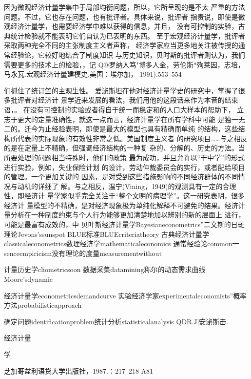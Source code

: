 因为微观经济计量学集中于局部均衡问题，所以，它所呈现的是不太
严重的方法问题。不过，它也存在问题，也有批评者。具体来说，批评者
指责说，即使是微观经济计量学，也需要经济学中难以获得的信息，并且，
没有可控制的实验，古典统计检验就不能表明它们自认为已表明的东西。
至于宏观经济计量学，批评者采取两种完全不同的主张制度主义者声称，
经济学家应当更多地关注被传授的通常经验论，它较好地结合了制度知识
与历史知识，贝时斯的批评者则认为，我们需要更多的技术上的检验，，记
Q@罗纳人笃"博多人金，劳伦斯*殉莱因，志培，马永瓦.宏观经济计量建模史.美国：埃尔加，
1991).553~554


们抓住了统订竺的主观生性。
爱泌斯坦在他对经济计量学史的研究中，掌握了很多批评者对经济计
景学近来发展的看法，我们用他的这段话来作为本音的结束语，。
在没有可控制的实验或者得自于统一而稳定和的人口大样本的帮助下，
立志于更大的定量准确性，就这一点而言，经济计量学在所有学科中可能
是独一无二的。迁今为止经验表明，即使是最大的模型也具有精确而单纯
的结构，这些结构所代表的实际现象的有效性非常之低。美国制度主义者
的研究项目……与之相反的是在定量上不精确，但强调经济结构的一种复
杂的、分解的、历史的方法。当所要处理的问题相当特殊时，他们的政策
最为成功，并且允许以“干中学”的形式进行实验，例如，失业保险计划
的设计，劳动仲裁委员会的实行，或者配给项目的管理。一个更加关键的
因素，是对受到这些措施影响的不同经济群体的不同情况与动机的详细了
解。与之相反，温宁(Vining，1949)的观测具有一定的合理性，即经济计
量学家似乎完全关注于“整个文明的病理学”。这一研究表明，很多经济计
量模型的不精确，是对经济现象极为单纯化解释不可避免的结果。经济计
量分析在一种制度约束与个人行为能够更加清楚地加以辨别的新的层面上
进行，可能是最富有成效的，中
贝叶斯经济计量学Bayesianeconometrics”二文斯的日斑理论Jevons’ssunspot
BLUE标准BLUEcriteriatheory
古典经济计量学classicaleconometrics数理经济学mathematicaleconomics
通常经验论common一senceempiricism没有理论的度量measurementwithout

计量历史学cliometricsoon
数据采集datamining称尔的动态需求曲线Moore’sdynamic

经济计量学econometricsdemandcurve
实验经济学家experimentaleconomists”概率方法probabilisticapproach

确定问题identificationproblem统计分析statisticalanalysis
QDR.J]安泌斯击.

经济计量

学

芝加哥盆利语贷大学出版社，1987.：217~218
A81
